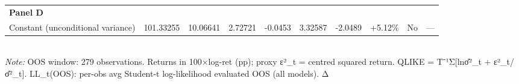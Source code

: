 \begin{table}[ht]
\begin{tabular}{lrrrrrrrrr}
\multicolumn{10}{l}{\textbf{Panel D}} \\
Constant (unconditional variance) & 101.33255 & 10.06641 & 2.72721 & -0.0453 & 3.32587 & -2.0489 & +5.12\% & No & — \\
\bottomrule
\end{tabular}
\\[3pt]\footnotesize\textit{Note:} OOS window: 279 observations. Returns in 100×log-ret (pp); proxy ε²_t = centred squared return. QLIKE = T⁻¹Σ[lnσ̂²_t + ε²_t/σ̂²_t]. LL_t(OOS): per-obs avg Student-t log-likelihood evaluated OOS (all models). Δ%
\end{table}